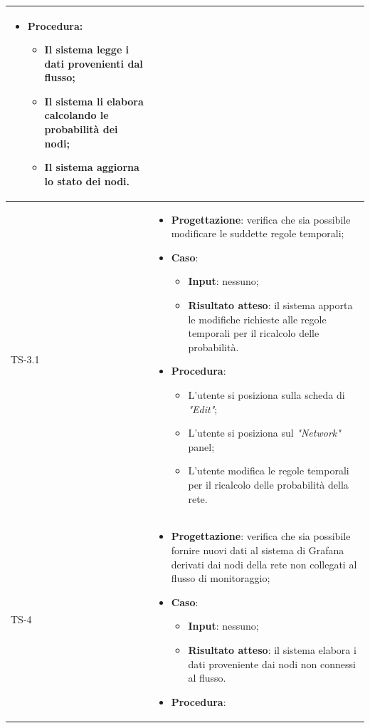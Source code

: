 \begin{longtable}{|C{2.5cm}|C{13cm}|}
\begin{itemize}
	\item \textbf{Procedura}:
	\begin{itemize}
		\item Il sistema legge i dati provenienti dal flusso;
		\item Il sistema li elabora calcolando le probabilità dei nodi;
		\item Il sistema aggiorna lo stato dei nodi.
	\end{itemize} 
\end{itemize}	
	\\
	\hline
	{TS-3.1} & 
\begin{itemize}
	\item \textbf{Progettazione}: verifica che sia possibile modificare le
	suddette regole temporali;
	\item \textbf{Caso}: 
	\begin{itemize}
		\item \textbf{Input}: nessuno;
		\item \textbf{Risultato atteso}: il sistema apporta le modifiche richieste alle regole temporali per il ricalcolo delle probabilità.
	\end{itemize}
	\item \textbf{Procedura}:
	\begin{itemize}
		\item L'utente si posiziona sulla scheda di \emph{"Edit"};
		\item L'utente si posiziona sul \emph{"Network"} panel;
		\item L'utente modifica le regole temporali per il ricalcolo delle probabilità della rete.
	\end{itemize} 
\end{itemize}
\\
	\hline
	{TS-4} & 
\begin{itemize}
	\item \textbf{Progettazione}: verifica che sia possibile fornire nuovi dati
	al sistema di Grafana derivati dai nodi della rete non collegati al flusso di
	monitoraggio;
	\item \textbf{Caso}: 
	\begin{itemize}
	\item \textbf{Input}: nessuno;
	\item \textbf{Risultato atteso}: il sistema elabora i dati proveniente dai nodi non connessi al flusso.
	\end{itemize}
	\item \textbf{Procedura}:
	\begin{itemize}

\end{itemize}
\end{itemize}
\end{longtable}
